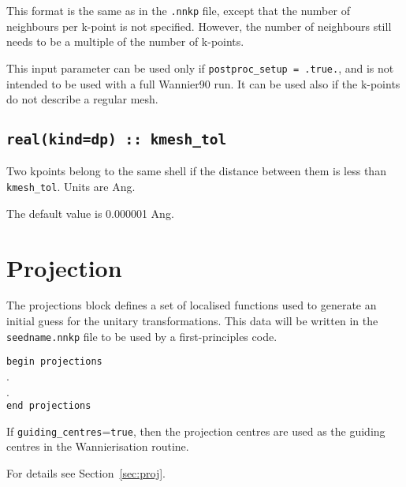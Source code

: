 This format is the same as in the \texttt{.nnkp} file, except that the number of neighbours per k-point is not specified. However, the number of neighbours still needs to be a multiple of the number of k-points.

This input parameter can be used only if \texttt{postproc\_setup = .true.}, and is not intended to be used with a full Wannier90 run. It can be used also if the k-points do not describe a regular mesh.

\subsection[kmesh\_tol]{\tt real(kind=dp) :: kmesh\_tol}

Two kpoints belong to the same shell if the distance between them is
less than {\tt kmesh\_tol}.
Units are Ang.

The default value is 0.000001 Ang.

\section{Projection}

 The projections block defines a set of localised functions used to
 generate an initial guess for the unitary transformations. %
This data will be written in the {\tt seedname.nnkp} file to be used
by a first-principles code.

\noindent \verb#begin projections# \\
  . \\
  . \\
\verb#end projections#

If \verb#guiding_centres#={\tt true}, then the projection centres are
used as the guiding centres in the Wannierisation routine.

For details see Section~\ref{sec:proj}.

